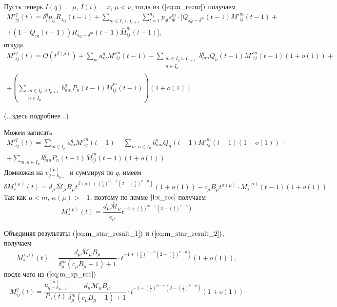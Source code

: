 \documentclass[11pt]{article}
\begin{document}
Пусть теперь $I(q) = \mu$, $I(i) = \nu$, $\mu < \nu$, тогда из $(\ref{eq:m_recur})$ получаем
\begin{multline}
    M'^q_{ij}(t) = \delta^q_i p_{ij} R_{s_{ij}}(t-1) + \sum_{m \in I_\mu \cup I_{\mu+1}} \sum_{l = 1}^{n_q} p_{ql} s_{ql}^m \cdot [ Q_{s_{ql} - \delta^m}(t-1) M'^m_{ij}(t-1) + \\
    + (1 - Q_m(t-1)) R_{s_{ql} - \delta^m}(t-1) \bar{M}^m_{ij}(t-1) ],
\end{multline}
откуда
\begin{multline}
    M'^q_{ij}(t) = O\left( t^{\beta(\mu)} \right) + \sum_m a^q_m M'^m_{ij}(t-1) - \sum_{\substack{m \in I_\mu \cup I_{\mu+1} \\ n \in I_\mu }} b^q_{mn} Q_n(t-1) M'^m_{ij}(t-1) (1 + o(1)) + \\
    + \left( \sum_{\substack{ m \in I_\mu \cup I_{\mu+1} \\ n \in I_\mu }} b^q_{mn} P_n(t-1) \bar{M}^m_{ij}(t-1) \right) (1 + o(1))
\end{multline}

(...здесь подробнее...)

Можем записать
\begin{multline}
    M'^q_{ij}(t) = \sum_{m \in I_\mu} a^q_m M'^m_{ij}(t-1) - \sum_{m,n \in I_\mu} b^q_{mn} Q_n(t-1) M'^m_{ij}(t-1) (1 + o(1)) + \\
   + \sum_{m,n \in I_\mu} b^q_{mn} P_n(t-1) \bar{M}^m_{ij}(t-1) (1 + o(1))
\end{multline}
Домножая на $v^{(\mu)}_{q - k_{\mu-1}}$ и суммируя по $q$, имеем
\begin{equation}
    \delta M^{(\mu)}_*(t) = d_\mu \overline{\mathcal{M}}_\mu B_\mu t^{\beta(\mu) + \left( \frac{1}{2} \right)^{m - \nu} \left( 2 - \left( \frac{1}{2} \right)^{\nu - \mu} \right)} (1 + o(1)) - c_\mu B_\mu t^{\alpha(\mu)} \cdot M^{(\mu)}_*(t-1) (1 + o(1))
\end{equation}
Так как $\mu < m$, $\alpha(\mu) > -1$, поэтому по лемме $\ref{l:x_rec}$ получаем
\begin{equation}
\label{eq:m_star_result_2}
    M^{(\mu)}_*(t) = \frac{ d_\mu \overline{\mathcal{M}}_\mu }{ c_\mu } t^{-1 + \left( \frac{1}{2} \right)^{m - \nu} \left( 2 - \left( \frac{1}{2} \right)^{\nu - \mu} \right)}
\end{equation}

Объединяя результаты $(\ref{eq:m_star_result_1})$ и $(\ref{eq:m_star_result_2})$, получаем
\begin{equation}
    M^{(\mu)}_*(t) = \frac{ d_\mu \overline{\mathcal{M}}_\mu B_\mu }{ \delta^m_\mu (c_\mu B_\mu - 1) + 1 } \cdot t^{-1 + \left( \frac{1}{2} \right)^{m - \nu} \left( 2 - \left( \frac{1}{2} \right)^{\nu - \mu} \right)} (1 + o(1)),
\end{equation}
после чего из $(\ref{eq:m_ap_rec})$
\begin{equation}
    M^q_{ij}(t) = \frac{ u^{(\mu)}_{q - k_{\mu-1}} }{ P_q(t) } \frac{ d_\mu \overline{\mathcal{M}}_\mu B_\mu }{ \delta^m_\mu (c_\mu B_\mu - 1) + 1 } \cdot t^{-1 + \left( \frac{1}{2} \right)^{m - \nu} \left( 2 - \left( \frac{1}{2} \right)^{\nu - \mu} \right)} (1 + o(1))
\end{equation}
\end{document}
